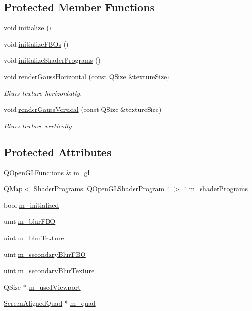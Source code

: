 \subsection*{Protected Member Functions}
\begin{DoxyCompactItemize}
\item 
void \hyperlink{class_blur_effect_a735fa8b4020353e440d226e3a48a9e46}{initialize} ()
\item 
void \hyperlink{class_blur_effect_a673b5ec9a6f4a32bc0bab462b32c7200}{initialize\+F\+B\+Os} ()
\item 
void \hyperlink{class_blur_effect_a3acf8584853e2a2befdbb69eeb65aa2a}{initialize\+Shader\+Programs} ()
\item 
void \hyperlink{class_blur_effect_ad25107035e2585492d3501d8d2d51aa2}{render\+Gauss\+Horizontal} (const Q\+Size \&texture\+Size)
\begin{DoxyCompactList}\small\item\em Blurs texture horizontally. \end{DoxyCompactList}\item 
void \hyperlink{class_blur_effect_aaaaec0e2eb4530834e7ab3ad8beec231}{render\+Gauss\+Vertical} (const Q\+Size \&texture\+Size)
\begin{DoxyCompactList}\small\item\em Blurs texture vertically. \end{DoxyCompactList}\end{DoxyCompactItemize}
\subsection*{Protected Attributes}
\begin{DoxyCompactItemize}
\item 
Q\+Open\+G\+L\+Functions \& \hyperlink{class_blur_effect_a60e476bb206ce650162006e19891f4e2}{m\+\_\+gl}
\item 
Q\+Map$<$ \hyperlink{shaderprograms_8h_ada89718f8d394b2cc093eb9770c554ff}{Shader\+Programs}, Q\+Open\+G\+L\+Shader\+Program $\ast$ $>$ $\ast$ \hyperlink{class_blur_effect_a36f1750676d9a4b935609300a2c8853c}{m\+\_\+shader\+Programs}
\item 
bool \hyperlink{class_blur_effect_abd260e17d64d3e819c9817e2ae92a33d}{m\+\_\+initialized}
\item 
uint \hyperlink{class_blur_effect_a3cf63e0dc804b038a9348923a5df12f5}{m\+\_\+blur\+F\+B\+O}
\item 
uint \hyperlink{class_blur_effect_a8d3832820bc3cf08171d449cc0dc9430}{m\+\_\+blur\+Texture}
\item 
uint \hyperlink{class_blur_effect_a8bcdeba40d4a73e06a02dc7507ed498e}{m\+\_\+secondary\+Blur\+F\+B\+O}
\item 
uint \hyperlink{class_blur_effect_a1e068c508f32617c867a92a56d521888}{m\+\_\+secondary\+Blur\+Texture}
\item 
Q\+Size $\ast$ \hyperlink{class_blur_effect_a8513aa58d2ff05cc6b135f60c25d0710}{m\+\_\+used\+Viewport}
\item 
\hyperlink{class_screen_aligned_quad}{Screen\+Aligned\+Quad} $\ast$ \hyperlink{class_blur_effect_aa5fb6e7e38f9548b89f7cc6e8de0882a}{m\+\_\+quad}
\end{DoxyCompactItemize}


